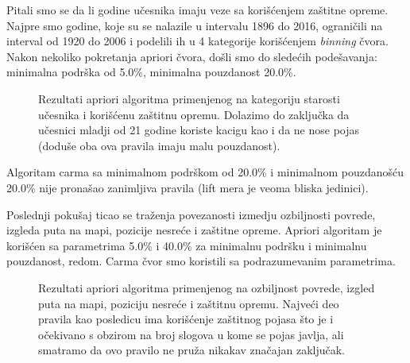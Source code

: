 \documentclass[a4paper,10pt]{article}
\begin{document}
Pitali smo se da li godine učesnika imaju veze sa korišćenjem zaštitne opreme. Najpre smo godine, koje su se nalazile u intervalu
1896 do 2016, ograničili na interval od 1920 do 2006 i podelili ih u 4 kategorije korišćenjem \textit{binning} čvora. Nakon nekoliko
pokretanja apriori čvora, došli smo do sledećih podešavanja: minimalna podrška od 5.0\%, minimalna pouzdanost 20.0\%.

\begin{figure}[h!]
 \centering
 \caption{Rezultati apriori algoritma primenjenog na kategoriju starosti učesnika i korišćenu zaštitnu opremu. Dolazimo do 
 zaključka da učesnici mladji od 21 godine koriste kacigu kao i da ne nose pojas (doduše oba ova pravila imaju malu pouzdanost). }
\end{figure}

Algoritam carma sa minimalnom podrškom od 20.0\% i minimalnom pouzdanošću 20.0\% nije pronašao zanimljiva pravila (lift mera je veoma
bliska jedinici).

Poslednji pokušaj ticao se traženja povezanosti izmedju ozbiljnosti povrede, izgleda puta na mapi, pozicije nesreće i zaštitne opreme. 
Apriori algoritam je korišćen sa parametrima 5.0\% i 40.0\% za minimalnu podršku i minimalnu pouzdanost, redom. Carma čvor smo koristili
sa podrazumevanim parametrima. 

\begin{figure}[h!]
 \centering
 \caption{Rezultati apriori algoritma primenjenog na ozbiljnost povrede, izgled puta na mapi, poziciju nesreće i zaštitnu opremu. 
 Najveći deo pravila kao posledicu ima korišćenje zaštitnog pojasa što je i očekivano s obzirom na broj slogova u kome se pojas 
 javlja, ali smatramo da ovo pravilo ne pruža nikakav značajan zaključak.}
\end{figure}
\end{document}
